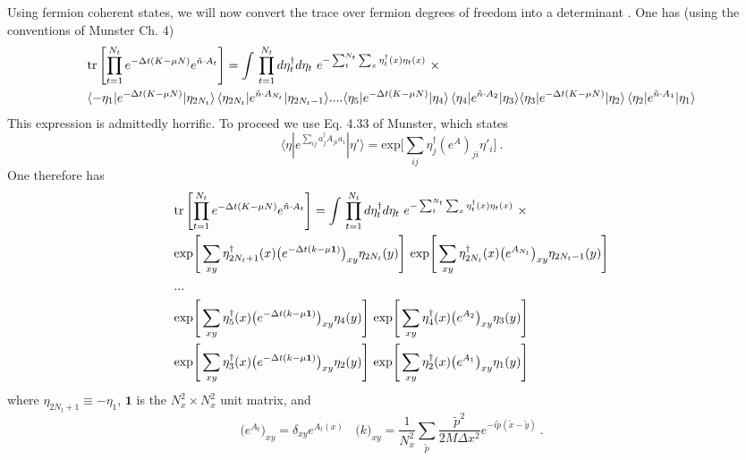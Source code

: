 Using fermion coherent states, we will now convert the trace over fermion degrees of freedom into a determinant . One has (using the conventions of Munster Ch. 4)
\begin{align*}
& \text{tr}\left[\prod_{t=1}^{N_t} e^{-\Delta t(K - \mu N)}  e^{ \tilde{n}\cdot A_t} \right]  = \int{} \prod_{t=1}^{N_t} d \eta^{\dagger}_t d\eta_t ~ e^{- \sum_{t}^{N_t}\sum_x \eta^{\dagger}_t(x) \eta_t(x)}~ \times \\
& \langle -\eta_1 | e^{-\Delta t(K - \mu N)} | \eta_{2 N_t} \rangle \, \langle \eta_{2 N_t} | e^{ \tilde{n} \cdot A_{N_t}} | \eta_{2 N_t -1} \rangle ....
\langle \eta_5 | e^{-\Delta t(K - \mu N)} | \eta_4 \rangle \, \langle \eta_4 | e^{ \tilde{n} \cdot A_2} | \eta_3 \rangle
\langle \eta_3 | e^{-\Delta t(K - \mu N)} | \eta_2 \rangle \, \langle \eta_2 | e^{ \tilde{n} \cdot A_1} | \eta_1 \rangle
\end{align*}
This expression is admittedly horrific. To proceed we use Eq. 4.33 of Munster, which states
\begin{equation}
\langle \eta | e^{\sum_{ij} a^{\dagger}_j A_{ji} a_i} | \eta' \rangle = \text{exp}\Bigg[ \sum_{i j} \eta^{\dagger}_j (e^A)_{ji} \eta'_i \Bigg]~.
\end{equation}
One therefore has
\begin{align*}
& \text{tr}\left[\prod_{t=1}^{N_t} e^{-\Delta t(K - \mu N)}  e^{ \tilde{n}\cdot A_t} \right]  = \int{} \prod_{t=1}^{N_t} d \eta^{\dagger}_t d\eta_t ~ e^{- \sum_{t}^{N_t}\sum_x \eta^{\dagger}_t(x) \eta_t(x)}~ \times \\
& \text{exp}\Bigg[ \sum_{xy} \eta^{\dagger}_{2 N_t +1}(x) \big(e^{-\Delta t(k-\mu \mathbf{1})}\big)_{xy} \eta_{2 N_t}(y)\Bigg] ~ \text{exp}\Bigg[ \sum_{xy} \eta^{\dagger}_{2 N_t}(x) \big(e^{A_{N_t} }\big)_{xy} \eta_{2 N_t -1}(y) \Bigg] \\
& ... \\
& \text{exp}\Bigg[ \sum_{xy} \eta^{\dagger}_5(x) \big(e^{-\Delta t(k-\mu \mathbf{1})}\big)_{xy} \eta_4(y)\Bigg] ~ \text{exp}\Bigg[ \sum_{xy} \eta^{\dagger}_4(x) \big(e^{A_2}\big)_{xy} \eta_3(y) \Bigg] \\
& \text{exp}\Bigg[ \sum_{xy} \eta^{\dagger}_3(x) \big(e^{-\Delta t(k-\mu \mathbf{1})}\big)_{xy} \eta_2(y)\Bigg] ~ \text{exp}\Bigg[ \sum_{xy} \eta^{\dagger}_2(x) \big(e^{A_1}\big)_{xy} \eta_1(y) \Bigg] 
\end{align*}
where $\eta_{2 N_t + 1} \equiv - \eta_1$, $\mathbf{1}$ is the $N_x^2 \times N_x^2$ unit matrix, and  
\begin{equation}
\Big( e^{A_t} \Big)_{xy} = \delta_{xy} e^{A_t(x)}~~~~\big(k\big)_{xy} = \frac{1}{N_x^2} \sum_{\tilde{p}} \frac{\tilde{p}^2}{2 M \Delta x^2} e^{-i \tilde{p} (\tilde{x}-\tilde{y})}~.
\end{equation}
